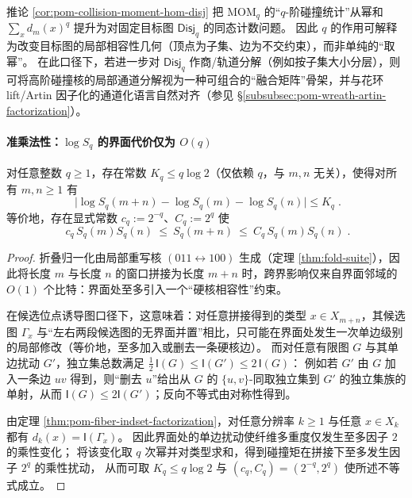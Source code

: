 \begin{remark}\label{rem:pom-disj-target-graph-fusion}
推论 \ref{cor:pom-collision-moment-hom-disj} 把 \(\mathrm{MOM}_q\) 的“\(q\)-阶碰撞统计”从幂和 \(\sum_x d_m(x)^q\) 提升为对固定目标图 \(\mathsf{Disj}_q\) 的同态计数问题。
因此 \(q\) 的作用可解释为改变目标图的局部相容性几何（顶点为子集、边为不交约束），而非单纯的“取幂”。
在此口径下，若进一步对 \(\mathsf{Disj}_q\) 作商/轨道分解（例如按子集大小分层），则可将高阶碰撞核的局部通道分解视为一种可组合的“融合矩阵”骨架，并与花环 lift/Artin 因子化的通道化语言自然对齐（参见 \S\ref{subsubsec:pom-wreath-artin-factorization}）。
\end{remark}

\paragraph{准乘法性：\texorpdfstring{$\log S_q$}{log Sq} 的界面代价仅为 \texorpdfstring{$O(q)$}{O(q)}}
\begin{proposition}[碰撞矩的准乘法性与近似子加性]\label{prop:pom-sq-quasi-multiplicative}
对任意整数 \(q\ge 1\)，存在常数 \(K_q\le q\log 2\)（仅依赖 \(q\)，与 \(m,n\) 无关），使得对所有 \(m,n\ge 1\) 有
\[
\boxed{\;
\bigl|\log S_q(m+n)-\log S_q(m)-\log S_q(n)\bigr|\le K_q\; }.
\]
等价地，存在显式常数 \(c_q:=2^{-q}\)、\(C_q:=2^{q}\) 使
\[
\boxed{\;
c_q\,S_q(m)S_q(n)\ \le\ S_q(m+n)\ \le\ C_q\,S_q(m)S_q(n)\; }.
\]
\end{proposition}
\begin{proof}
折叠归一化由局部重写核 \((011\leftrightarrow 100)\) 生成（定理 \ref{thm:fold-suite}），因此将长度 \(m\) 与长度 \(n\) 的窗口拼接为长度 \(m+n\) 时，跨界影响仅来自界面邻域的 \(O(1)\) 个比特：界面处至多引入一个“硬核相容性”约束。
\par
在候选位点诱导图口径下，这意味着：对任意拼接得到的类型 \(x\in X_{m+n}\)，其候选图 \(\Gamma_x\) 与“左右两段候选图的无界面并置”相比，只可能在界面处发生一次单边级别的局部修改（等价地，至多加入或删去一条硬核边）。
而对任意有限图 \(G\) 与其单边扰动 \(G'\)，独立集总数满足
\(
\tfrac12\,\mathsf{I}(G)\le \mathsf{I}(G')\le 2\,\mathsf{I}(G)
\)：
例如若 \(G'\) 由 \(G\) 加入一条边 \(uv\) 得到，则“删去 \(u\)”给出从 \(G\) 的 \(\{u,v\}\)-同取独立集到 \(G'\) 的独立集族的单射，从而 \(\mathsf{I}(G)\le 2\mathsf{I}(G')\)；反向不等式由对称性得到。
\par
由定理 \ref{thm:pom-fiber-indset-factorization}，对任意分辨率 \(k\ge 1\) 与任意 \(x\in X_k\) 都有 \(d_k(x)=\mathsf{I}(\Gamma_x)\)。
因此界面处的单边扰动使纤维多重度仅发生至多因子 \(2\) 的乘性变化；
将该变化取 \(q\) 次幂并对类型求和，得到碰撞矩在拼接下至多发生因子 \(2^q\) 的乘性扰动，
从而可取 \(K_q\le q\log 2\) 与 \((c_q,C_q)=(2^{-q},2^q)\) 使所述不等式成立。
\end{proof}

